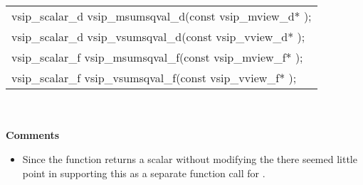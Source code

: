 \\\cvsiplh
\afh
\\\hspace*{.04\textwidth} {
\ttfamily
\begin{tabular}[H]{l}
vsip\_scalar\_d vsip\_msumsqval\_d(const vsip\_mview\_d* );\\
vsip\_scalar\_d vsip\_vsumsqval\_d(const vsip\_vview\_d* );\\
vsip\_scalar\_f vsip\_msumsqval\_f(const vsip\_mview\_f* );\\
vsip\_scalar\_f vsip\_vsumsqval\_f(const vsip\_vview\_f* );\\
\end{tabular}
}
\\\pyjvsiph
{}
\\ \hspace*{.8cm} \textbf{Comments}
\\\hspace*{.9cm}\parbox{10.8cm}{\vspace*{.1cm}\begin{itemize}
\item{Since the  function returns a scalar without modifying the  there seemed little point in supporting this as a separate function call for \pyjv.}
\end{itemize}
}

